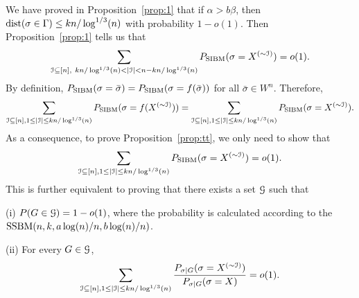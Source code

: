 \documentclass{article}
\begin{document}
We have proved in Proposition~\ref{prop:1} that if $\alpha>b\beta$, then $\operatorname{dist}(\sigma \in \Gamma) \le kn/\log^{1/3}(n)$
 with probability $1-o(1)$.
Then Proposition~\ref{prop:1} tells us that
$$
\sum_{\cI\subseteq[n],~
kn/\log^{1/3}(n)<|\cI|<n-kn/\log^{1/3}(n)} P_{\SIBM}(\sigma=X^{(\sim\cI)})  = o(1) .
$$
By definition, $P_{\operatorname{SIBM}}(\sigma=\bar{\sigma})=P_{\operatorname{SIBM}}(\sigma=f(\bar{\sigma}))$ for all $\bar{\sigma}\in W^n$. Therefore, 
$$
\sum_{\mathcal{I}\subseteq[n],1\le |\mathcal{I}|\le kn/\log^{1/3}(n)} P_{\operatorname{SIBM}}(\sigma=f(X^{(\sim\mathcal{I})})) =\sum_{\mathcal{I}\subseteq[n],1\le |\mathcal{I}|\le kn/\log^{1/3}(n)} P_{\operatorname{SIBM}}(\sigma=X^{(\sim\mathcal{I})}).
$$
As a consequence, to prove Proposition~\ref{prop:tt}, we only need to show that
$$
\sum_{\mathcal{I}\subseteq[n],1\le |\mathcal{I}|\le kn/\log^{1/3}(n)} P_{\operatorname{SIBM}}(\sigma=X^{(\sim\mathcal{I})}) 
= o(1) .
$$
This is further equivalent to proving that there exists a set $\mathcal{G}$ such that

\noindent (i)
$P(G\in\mathcal{G})=1-o(1)$, where the probability is calculated according to the $\SSBM(n, k,a\log(n)/n, \linebreak[4] b\log(n)/n)$.

\noindent (ii)
For every $G\in\mathcal{G}$,
$$
\sum_{\mathcal{I}\subseteq[n],1\le |\mathcal{I}|\le kn/\log^{1/3}(n)}
\frac{P_{\sigma|G}(\sigma=X^{(\sim\mathcal{I})})}{P_{\sigma|G}(\sigma=X)} =o(1) .
$$
\end{document}
